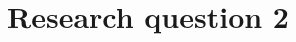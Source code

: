 \documentclass[../main]{subfiles}
\begin{document}
\chapter{Research question 2}
\label{ch:reserach_question2}


\end{document}
